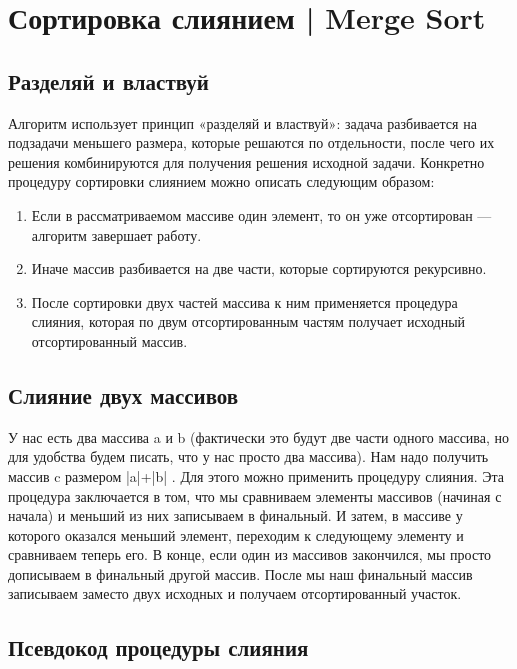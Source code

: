 \section{Сортировка слиянием | Merge Sort}

\subsection{Разделяй и властвуй}

Алгоритм использует принцип «разделяй и властвуй»: задача разбивается на подзадачи меньшего размера, которые решаются по отдельности, после чего их решения комбинируются для получения решения исходной задачи. Конкретно процедуру сортировки слиянием можно описать следующим образом:

\begin{enumerate}
    \item Если в рассматриваемом массиве один элемент, то он уже отсортирован — алгоритм завершает работу.
    \item Иначе массив разбивается на две части, которые сортируются рекурсивно.
    \item После сортировки двух частей массива к ним применяется процедура слияния, которая по двум отсортированным частям получает исходный отсортированный массив.

\end{enumerate}

\subsection{Слияние двух массивов}

У нас есть два массива a
и b
(фактически это будут две части одного массива, но для удобства будем писать, что у нас просто два массива). Нам надо получить массив c
размером |a|+|b|
. Для этого можно применить процедуру слияния. Эта процедура заключается в том, что мы сравниваем элементы массивов (начиная с начала) и меньший из них записываем в финальный. И затем, в массиве у которого оказался меньший элемент, переходим к следующему элементу и сравниваем теперь его. В конце, если один из массивов закончился, мы просто дописываем в финальный другой массив. После мы наш финальный массив записываем заместо двух исходных и получаем отсортированный участок.

\subsection{Псевдокод процедуры слияния}

